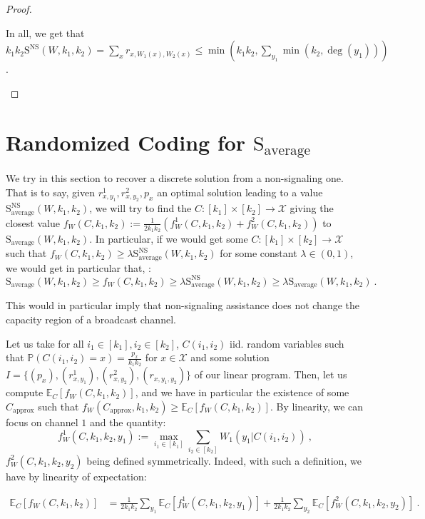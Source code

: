 \documentclass[11pt]{article}
\theoremstyle{definition}
\theoremstyle{remark}
\begin{document}
\begin{proof}
\begin{enumerate}
  In all, we get that $k_1k_2\mathrm{S}^{\textrm{NS}}(W,k_1,k_2) = \sum_x r_{x,W_1(x),W_2(x)} \leq \min\left(k_1k_2,\sum_{y_1}\min(k_2,\deg(y_1))\right)$.
  \end{enumerate}
\end{proof}

\section{Randomized Coding for $\mathrm{S}_{\text{average}}$}
We try in this section to recover a discrete solution from a non-signaling one. That is to say, given $r^1_{x,y_1}, r^2_{x,y_2}, p_x$ an optimal solution leading to a value $\mathrm{S}_{\text{average}}^{\mathrm{NS}}(W,k_1,k_2)$, we will try to find the $C : [k_1] \times [k_2] \rightarrow \mathcal{X}$ giving the closest value $f_W(C,k_1,k_2):=\frac{1}{2k_1k_2}\left(f_W^1(C,k_1,k_2)+f_W^2(C,k_1,k_2)\right)$ to $\mathrm{S}_{\text{average}}(W,k_1,k_2)$. In particular, if we would get some $C : [k_1] \times [k_2] \rightarrow \mathcal{X}$ such that $f_W(C,k_1,k_2) \geq \lambda \mathrm{S}_{\text{average}}^{\mathrm{NS}}(W,k_1,k_2)$ for some constant $\lambda \in (0,1)$, we would get in particular that, :
\[  \mathrm{S}_{\text{average}}(W,k_1,k_2) \geq f_W(C,k_1,k_2) \geq \lambda \mathrm{S}_{\text{average}}^{\mathrm{NS}}(W,k_1,k_2) \geq \lambda \mathrm{S}_{\text{average}}(W,k_1,k_2) \ .\]

This would in particular imply that non-signaling assistance does not change the capacity region of a broadcast channel.

Let us take for all $i_1 \in [k_1], i_2 \in [k_2]$, $C(i_1,i_2)$ iid. random variables such that $\mathbb{P}\left(C(i_1,i_2) = x\right) = \frac{p_x}{k_1k_2}$ for $x \in \mathcal{X}$ and some solution $I=\{(p_x),(r^1_{x,y_1}),(r^2_{x,y_2}),(r_{x,y_1,y_2})\}$ of our linear program. Then, let us compute $\mathbb{E}_C\left[f_W(C,k_1,k_2)\right]$, and we have in particular the existence of some $C_{\text{approx}}$ such that $f_W(C_{\text{approx}},k_1,k_2) \geq \mathbb{E}_C\left[f_W(C,k_1,k_2)\right]$. By linearity, we can focus on channel $1$ and the quantity:
\[ f_W^1(C,k_1,k_2,y_1):=\max_{i_1 \in [k_1]} \sum_{i_2 \in [k_2]} W_1(y_1|C(i_1,i_2)) \ ,\]
$f_W^2(C,k_1,k_2,y_2)$ being defined symmetrically. Indeed, with such a definition, we have by linearity of expectation:

\begin{equation}
  \begin{aligned}
    \mathbb{E}_C\left[f_W(C,k_1,k_2)\right] &= \frac{1}{2k_1k_2}\sum_{y_1}\mathbb{E}_C\left[f_W^1(C,k_1,k_2,y_1)\right]+ \frac{1}{2k_1k_2}\sum_{y_2}\mathbb{E}_C\left[f_W^2(C,k_1,k_2,y_2)\right] \ .
  \end{aligned}
\end{equation}
\end{document}
